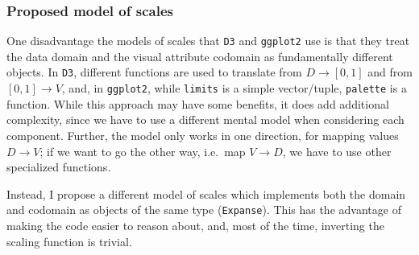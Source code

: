 \documentclass[
]{book}
\newenvironment{Shaded}{\begin{snugshade}}{\end{snugshade}}
\newcommand{\AttributeTok}[1]{\textcolor[rgb]{0.13,0.29,0.53}{#1}}
\newcommand{\CommentTok}[1]{\textcolor[rgb]{0.56,0.35,0.01}{\textit{#1}}}
\newcommand{\ControlFlowTok}[1]{\textcolor[rgb]{0.13,0.29,0.53}{\textbf{#1}}}
\newcommand{\FunctionTok}[1]{\textcolor[rgb]{0.13,0.29,0.53}{\textbf{#1}}}
\newcommand{\NormalTok}[1]{#1}
\newcommand{\OtherTok}[1]{\textcolor[rgb]{0.56,0.35,0.01}{#1}}
\newcommand{\SpecialCharTok}[1]{\textcolor[rgb]{0.81,0.36,0.00}{\textbf{#1}}}
\theoremstyle{definition}
\theoremstyle{definition}
\theoremstyle{definition}
\theoremstyle{definition}
\theoremstyle{remark}
\begin{document}
\begin{Shaded}
\end{Shaded}

\subsubsection{Proposed model of scales}\label{proposed-model-of-scales}

One disadvantage the models of scales that \texttt{D3} and \texttt{ggplot2} use is that they treat the data domain and the visual attribute codomain as fundamentally different objects. In \texttt{D3}, different functions are used to translate from \(D \to [0, 1]\) and from \([0, 1] \to V\), and, in \texttt{ggplot2}, while \texttt{limits} is a simple vector/tuple, \texttt{palette} is a function. While this approach may have some benefits, it does add additional complexity, since we have to use a different mental model when considering each component. Further, the model only works in one direction, for mapping values \(D \to V\); if we want to go the other way, i.e.~map \(V \to D\), we have to use other specialized functions.

Instead, I propose a different model of scales which implements both the domain and codomain as objects of the same type (\texttt{Expanse}). This has the advantage of making the code easier to reason about, and, most of the time, inverting the scaling function is trivial.
\end{document}
